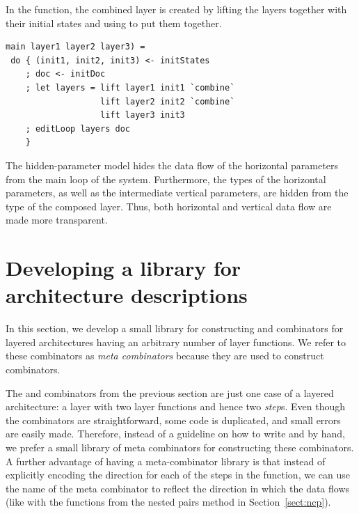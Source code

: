\documentclass[preprint,natbib]{sigplanconf}
\begin{document}
In the  function, the combined layer is created by lifting the layers together with their initial states and using  to put them together.

\begin{small}
\begin{verbatim}
main layer1 layer2 layer3) =
 do { (init1, init2, init3) <- initStates
    ; doc <- initDoc 
    ; let layers = lift layer1 init1 `combine` 
                   lift layer2 init2 `combine`
                   lift layer3 init3
    ; editLoop layers doc
    }
\end{verbatim}
\end{small}


The hidden-parameter model hides the data flow of the horizontal parameters from the main loop of the system. Furthermore, the types of the horizontal parameters, as well as the intermediate vertical parameters, are hidden from the type of the composed layer. Thus, both horizontal and vertical data flow are made more transparent. 



%																
%																
%																
\section{Developing a library for architecture descriptions} \label{sect:lib}

In this section, we develop a small library for constructing  and  combinators for layered architectures having an arbitrary number of layer functions. We refer to these combinators as {\em meta combinators} because they are used to construct combinators.

The  and  combinators from the previous section are just one case of a layered architecture: a layer with two layer functions and hence two {\em step}s. Even though the combinators are straightforward, some code is duplicated, and small errors are easily made. Therefore, instead of a guideline on how to write  and  by hand, we prefer a small library of meta combinators for constructing these combinators. A further  advantage of having  a meta-combinator library is that instead of explicitly encoding the direction for each of the steps in the  function, we can use the name of the meta combinator to reflect the direction in which the data flows (like with the  functions from the nested pairs method in Section~\ref{sect:ncp}).
\end{document}

